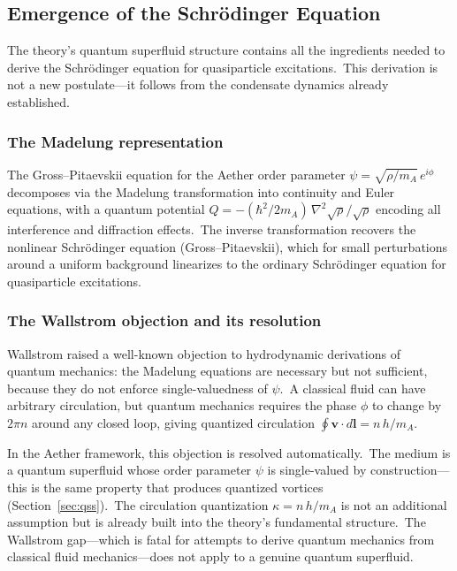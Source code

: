 ﻿\documentclass[12pt,letterpaper]{article}
\begin{document}
\subsection{Emergence of the Schr\"{o}dinger Equation}

The theory's quantum superfluid structure contains all the ingredients needed to derive
the Schr\"{o}dinger equation for quasiparticle excitations.\ This derivation is not a
new postulate---it follows from the condensate dynamics already established.

\subsubsection*{The Madelung representation}

The Gross--Pitaevskii equation for the Aether order parameter
$\psi = \sqrt{\rho/m_A}\,e^{i\phi}$ decomposes via the Madelung
transformation \cite{madelung1927} into continuity and Euler equations,
with a quantum potential
$Q = -(\hbar^2/2m_A)\,\nabla^2\!\sqrt{\rho}/\sqrt{\rho}$ encoding all
interference and diffraction effects.\ The inverse transformation
recovers the nonlinear Schr\"{o}dinger equation (Gross--Pitaevskii), which
for small perturbations around a uniform background linearizes to the
ordinary Schr\"{o}dinger equation for quasiparticle excitations.

\subsubsection*{The Wallstrom objection and its resolution}

Wallstrom \cite{wallstrom1994} raised a well-known objection to hydrodynamic derivations
of quantum mechanics: the Madelung equations are necessary but not sufficient, because
they do not enforce single-valuedness of $\psi$.\ A classical fluid can have arbitrary
circulation, but quantum mechanics requires the phase $\phi$ to change by $2\pi n$ around
any closed loop, giving quantized circulation $\oint\mathbf{v}\cdot d\mathbf{l} = n\,h/m_A$.

In the Aether framework, this objection is resolved automatically.\ The medium is a
quantum superfluid whose order parameter $\psi$ is single-valued by construction---this
is the same property that produces quantized vortices (Section~\ref{sec:qss}).\ The
circulation quantization $\kappa = n\,h/m_A$ is not an additional assumption but is
already built into the theory's fundamental structure.\ The Wallstrom gap---which is
fatal for attempts to derive quantum mechanics from classical fluid mechanics---does not
apply to a genuine quantum superfluid.
\end{document}
